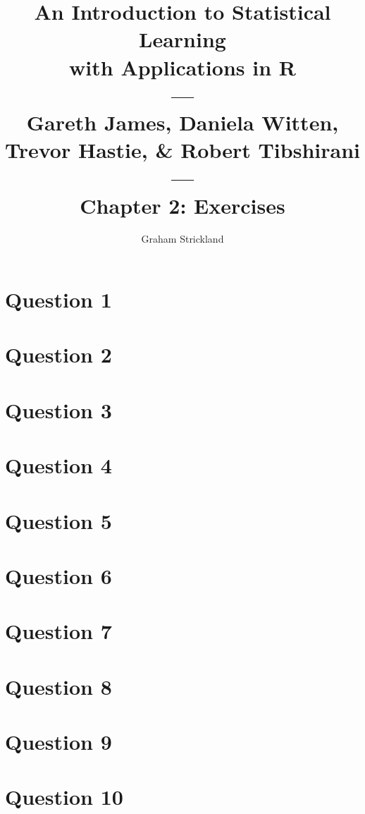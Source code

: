 \documentclass{article}
\title{
    An Introduction to Statistical Learning\\with Applications in R\\---\\
    Gareth James, Daniela Witten, Trevor Hastie, \& Robert Tibshirani\\---\\
    Chapter 2: Exercises
}
\author{Graham Strickland}
\begin{document}
\maketitle  

\section*{Question 1}


\section*{Question 2}


\section*{Question 3}


\section*{Question 4}


\section*{Question 5}


\section*{Question 6}


\section*{Question 7}


\section*{Question 8}


\section*{Question 9}


\section*{Question 10}

\end{document}
